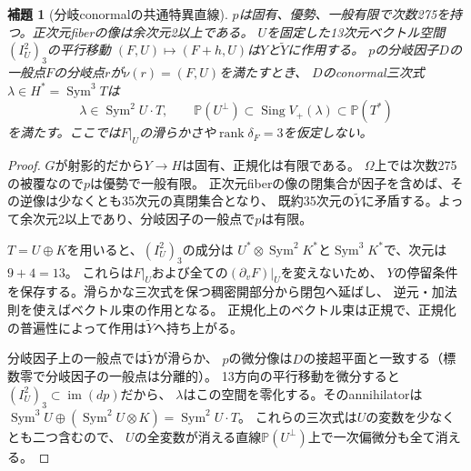 \documentclass[11pt,a4paper]{ltjsarticle}
\newtheorem{lemma}[theorem]{補題}
\newcommand{\PP}{\mathbb P}
\newcommand{\Sym}{\operatorname{Sym}}
\newcommand{\rk}{\operatorname{rank}}
\newcommand{\Sing}{\operatorname{Sing}}
\begin{document}
\begin{lemma}[分岐conormalの共通特異直線]\label{lem:conormal}
$p$は固有、優勢、一般有限で次数275を持つ。正次元fiberの像は余次元2以上である。
$U$を固定した13次元ベクトル空間$(I_U^2)_3$の平行移動
$(F,U)\mapsto(F+h,U)$は$Y$と$\widetilde Y$に作用する。
$p$の分岐因子$D$の一般点$F$の分岐点$r$が$\nu(r)=(F,U)$を満たすとき、
$D$のconormal三次式$\lambda\in H^*=\Sym^3T$は
\begin{equation}\label{eq:conormal}
 \lambda\in\Sym^2U\cdot T,\qquad
 \PP(U^\perp)\subset\Sing V_+(\lambda)\subset\PP(T^*)
\end{equation}
を満たす。ここでは$F|_U$の滑らかさや$\rk\delta_F=3$を仮定しない。
\end{lemma}
\begin{proof}
$G$が射影的だから$Y\to H$は固有、正規化は有限である。
$\Omega$上では次数275の被覆なので$p$は優勢で一般有限。
正次元fiberの像の閉集合が因子を含めば、その逆像は少なくとも35次元の真閉集合となり、
既約35次元の$\widetilde Y$に矛盾する。よって余次元2以上であり、分岐因子の一般点で$p$は有限。

$T=U\oplus K$を用いると、$(I_U^2)_3$の成分は
$U^*\otimes\Sym^2K^*$と$\Sym^3K^*$で、次元は$9+4=13$。
これらは$F|_U$および全ての$(\partial_vF)|_U$を変えないため、
$Y$の停留条件を保存する。滑らかな三次式を保つ稠密開部分から閉包へ延ばし、
逆元・加法則を使えばベクトル束の作用となる。
正規化上のベクトル束は正規で、正規化の普遍性によって作用は$\widetilde Y$へ持ち上がる。

分岐因子上の一般点では$\widetilde Y$が滑らか、
$p$の微分像は$D$の接超平面と一致する（標数零で分岐因子の一般点は分離的）。
13方向の平行移動を微分すると
$(I_U^2)_3\subset\operatorname{im}(dp)$だから、
$\lambda$はこの空間を零化する。そのannihilatorは
$\Sym^3U\oplus(\Sym^2U\otimes K)=\Sym^2U\cdot T$。
これらの三次式は$U$の変数を少なくとも二つ含むので、
$U$の全変数が消える直線$\PP(U^\perp)$上で一次偏微分も全て消える。
\end{proof}
\end{document}
